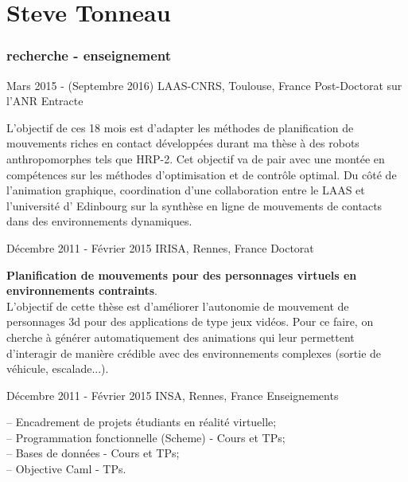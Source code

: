 \documentclass{tccv}
\begin{document}
\part{Steve Tonneau}

\section{recherche - enseignement}

\begin{eventlist}

\item{ Mars 2015 - (Septembre 2016)}
     {LAAS-CNRS, Toulouse, France}
     {Post-Doctorat sur l'ANR Entracte}
     
     L'objectif de ces 18 mois est d'adapter les m\'ethodes de planification de mouvements riches en contact d\'evelop\-p\'ees durant ma th\`ese 
     \`a des robots anthropomorphes tels que HRP-2. Cet objectif va de pair avec une mont\'ee en comp\'etences sur les m\'ethodes d'optimisation et de contr\^ole optimal.
     Du c\^ot\'e de l'animation graphique, coordination d'une collaboration entre le LAAS et l'universit\'e d' Edinbourg sur la synth\`ese en ligne de mouvements de contacts
     dans des environnements dynamiques.

\item{ D\'ecembre 2011 - F\'evrier 2015}
     {IRISA, Rennes, France}
     {Doctorat}
	 
 \textbf{Planification de mouvements pour des personnages virtuels en environnements contraints}.\\
 L'objectif de cette th\`{e}se est d'am\'{e}liorer l'autonomie de mouvement de personnages 3d pour des applications 
 de type jeux vid\'{e}os. Pour ce faire, on cherche \`{a} g\'{e}n\'{e}rer automatiquement des animations qui leur permettent d'interagir de mani\`{e}re
 cr\'{e}\-dible avec des environnements complexes (sortie de v\'ehicule, escalade...).

\item{ D\'ecembre 2011 - F\'evrier 2015}
     {INSA, Rennes, France}
     {Enseignements}

-- Encadrement de projets \'etudiants en r\'ealit\'e virtuelle;
\\-- Programmation fonctionnelle (Scheme) - Cours et TPs;
\\ -- Bases de donn\'{e}es - Cours et TPs;
\\ -- Objective Caml - TPs.

\end{eventlist}
\end{document}
